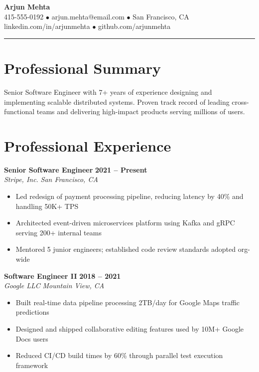 \documentclass[11pt,letterpaper]{article}
\begin{document}
\begin{center}
{\LARGE\bfseries Arjun Mehta} \\[4pt]
{\normalsize 415-555-0192 \quad $\bullet$ \quad arjun.mehta@email.com \quad $\bullet$ \quad San Francisco, CA} \\[2pt]
{\normalsize linkedin.com/in/arjunmehta \quad $\bullet$ \quad github.com/arjunmehta}
\end{center}

\vspace{-4pt}
\noindent\rule{\textwidth}{1.2pt}

\section{Professional Summary}
Senior Software Engineer with 7+ years of experience designing and implementing scalable distributed systems. Proven track record of leading cross-functional teams and delivering high-impact products serving millions of users.

\section{Professional Experience}

\noindent\textbf{Senior Software Engineer} \hfill \textbf{2021 -- Present} \\
\textit{Stripe, Inc.} \hfill \textit{San Francisco, CA}
\begin{itemize}[leftmargin=1.5em, topsep=2pt, itemsep=1pt]
  \item Led redesign of payment processing pipeline, reducing latency by 40\% and handling 50K+ TPS
  \item Architected event-driven microservices platform using Kafka and gRPC serving 200+ internal teams
  \item Mentored 5 junior engineers; established code review standards adopted org-wide
\end{itemize}

\noindent\textbf{Software Engineer II} \hfill \textbf{2018 -- 2021} \\
\textit{Google LLC} \hfill \textit{Mountain View, CA}
\begin{itemize}[leftmargin=1.5em, topsep=2pt, itemsep=1pt]
  \item Built real-time data pipeline processing 2TB/day for Google Maps traffic predictions
  \item Designed and shipped collaborative editing features used by 10M+ Google Docs users
  \item Reduced CI/CD build times by 60\% through parallel test execution framework
\end{itemize}
\end{document}
